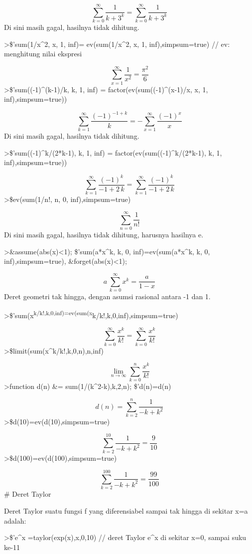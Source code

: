\documentclass[
]{book}
\begin{document}
\[\sum_{k=0}^{\infty }{\frac{1}{k+3^{k}}}=\sum_{k=0}^{\infty }{\frac{  1}{k+3^{k}}}\]Di sini masih gagal, hasilnya tidak dihitung.

\textgreater\$'sum(1/x\^{}2, x, 1, inf)= ev(sum(1/x\^{}2, x, 1, inf),simpsum=true) // ev: menghitung nilai ekspresi

\[\sum_{x=1}^{\infty }{\frac{1}{x^2}}=\frac{\pi^2}{6}\]\textgreater\$'sum((-1)\^{}(k-1)/k, k, 1, inf) = factor(ev(sum((-1)\^{}(x-1)/x, x, 1, inf),simpsum=true))

\[\sum_{k=1}^{\infty }{\frac{\left(-1\right)^{-1+k}}{k}}=-\sum_{x=1  }^{\infty }{\frac{\left(-1\right)^{x}}{x}}\]Di sini masih gagal, hasilnya tidak dihitung.

\textgreater\$'sum((-1)\^{}k/(2*k-1), k, 1, inf) = factor(ev(sum((-1)\^{}k/(2*k-1), k, 1, inf),simpsum=true))

\[\sum_{k=1}^{\infty }{\frac{\left(-1\right)^{k}}{-1+2\,k}}=\sum_{k=1  }^{\infty }{\frac{\left(-1\right)^{k}}{-1+2\,k}}\]\textgreater\$ev(sum(1/n!, n, 0, inf),simpsum=true)

\[\sum_{n=0}^{\infty }{\frac{1}{n!}}\]Di sini masih gagal, hasilnya tidak dihitung, harusnya hasilnya e.

\textgreater\&assume(abs(x)\textless1); \$'sum(a*x\^{}k, k, 0, inf)=ev(sum(a*x\^{}k, k, 0, inf),simpsum=true), \&forget(abs(x)\textless1);

\[a\,\sum_{k=0}^{\infty }{x^{k}}=\frac{a}{1-x}\]Deret geometri tak hingga, dengan asumsi rasional antara -1 dan 1.

\textgreater\$'sum(x\textsuperscript{k/k!,k,0,inf)=ev(sum(x}k/k!,k,0,inf),simpsum=true)

\[\sum_{k=0}^{\infty }{\frac{x^{k}}{k!}}=\sum_{k=0}^{\infty }{\frac{x  ^{k}}{k!}}\]\textgreater\$limit(sum(x\^{}k/k!,k,0,n),n,inf)

\[\lim_{n\rightarrow \infty }{\sum_{k=0}^{n}{\frac{x^{k}}{k!}}}\]\textgreater function d(n) \&= sum(1/(k\^{}2-k),k,2,n); \$'d(n)=d(n)

\[d\left(n\right)=\sum_{k=2}^{n}{\frac{1}{-k+k^2}}\]\textgreater\$d(10)=ev(d(10),simpsum=true)

\[\sum_{k=2}^{10}{\frac{1}{-k+k^2}}=\frac{9}{10}\]\textgreater\$d(100)=ev(d(100),simpsum=true)

\[\sum_{k=2}^{100}{\frac{1}{-k+k^2}}=\frac{99}{100}\]\# Deret Taylor

Deret Taylor suatu fungsi f yang diferensiabel sampai tak hingga di sekitar x=a adalah:

\textgreater\$'e\^{}x =taylor(exp(x),x,0,10) // deret Taylor e\^{}x di sekitar x=0, sampai suku ke-11
\end{document}
